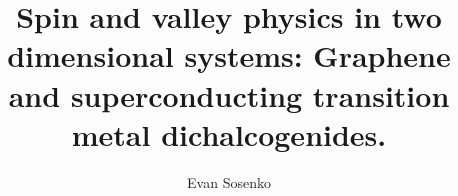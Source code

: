 \title{Spin and valley physics in two dimensional systems: %
  Graphene and superconducting transition metal dichalcogenides.}
\author{Evan Sosenko}

\maketitle
